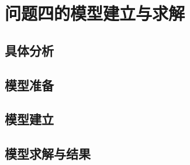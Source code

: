 \clearpage
\section{问题四的模型建立与求解}
\subsection{具体分析}
\subsection{模型准备}
\subsection{模型建立}
\subsection{模型求解与结果}
